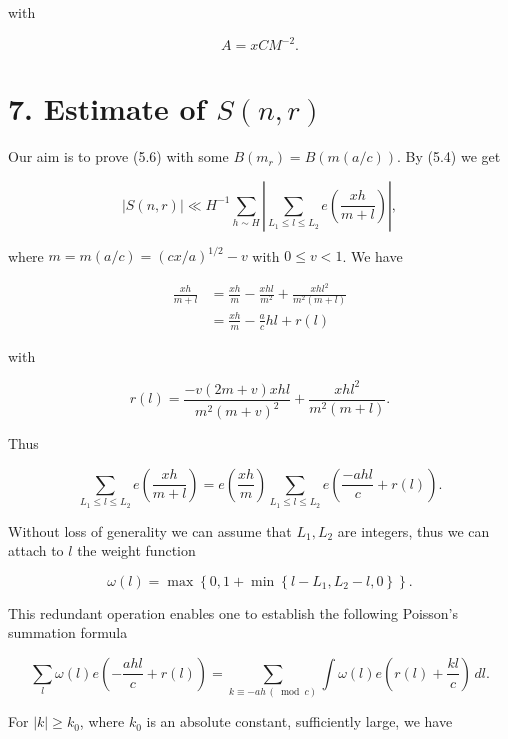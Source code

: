 \documentclass[10pt]{article}
\begin{document}
with


\begin{equation*}
A=x C M^{-2} . \tag{6.12}
\end{equation*}


\section*{7. Estimate of $S(n, r)$}
Our aim is to prove (5.6) with some $B\left(m_{r}\right)=B(m(a / c))$. By (5.4) we get

$$
|S(n,r)|\ll H^{-1} \sum_{h \sim H}\left|\sum_{L_{1} \leqslant l \leqslant L_{2}} e\left(\frac{x h}{m+l}\right)\right|,
$$

where $m=m(a / c)=(c x / a)^{1 / 2}-v$ with $0 \leqslant v<1$. We have

$$
\begin{aligned}
\frac{x h}{m+l} & =\frac{x h}{m}-\frac{x h l}{m^{2}}+\frac{x h l^{2}}{m^{2}(m+l)} \\
& =\frac{x h}{m}-\frac{a}{c} h l+r(l)
\end{aligned}
$$

with


\begin{equation*}
r(l)=\frac{-v(2 m+v) x h l}{m^{2}(m+v)^{2}}+\frac{x h l^{2}}{m^{2}(m+l)} . \tag{7.1}
\end{equation*}


Thus

$$
\sum_{L_{1} \leqslant l \leqslant L_{2}} e\left(\frac{x h}{m+l}\right)=e\left(\frac{x h}{m}\right) \sum_{L_{1} \leqslant l \leqslant L_{2}} e\left(\frac{-a h l}{c}+r(l)\right) .
$$

Without loss of generality we can assume that $L_{1}, L_{2}$ are integers, thus we can attach to $l$ the weight function

$$
\omega(l)=\max \left\{0,1+\min \left\{l-L_{1}, L_{2}-l, 0\right\}\right\} .
$$

This redundant operation enables one to establish the following Poisson's summation formula


\begin{equation*}
\sum_{l}\omega(l)e\left(-\frac{ahl}{c}+r(l)\right)
=\sum_{k\equiv-ah\, (\bmod c)}\int \omega(l)e\left(r(l)+\frac{kl}{c}\right)\,dl. \tag{7.2}
\end{equation*}


For $|k| \geqslant k_{0}$, where $k_{0}$ is an absolute constant, sufficiently large, we have
\end{document}
